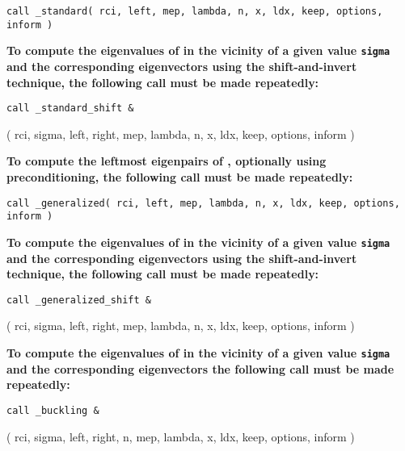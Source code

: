 \medskip
{\tt call
\solver\_standard( rci, left, mep, lambda, n, x, ldx, keep, options, inform )
}

\medskip
\noindent
{\bf
To compute the eigenvalues of  %
in the vicinity of 
a given value {\tt sigma}
and the corresponding eigenvectors using the shift-and-invert technique,
the following call must be made repeatedly:
}

\medskip
{\tt call
\solver\_standard\_shift \&

\hspace{8mm} 
( rci, sigma, left, right, mep, lambda, n, x, ldx, keep, options, inform )
}

\medskip
\noindent
{\bf
To compute %
the leftmost eigenpairs of ,
optionally using preconditioning,
the following call must be made repeatedly:
}

\medskip
{\tt call
\solver\_generalized( rci, left, mep, lambda, n, x, ldx, keep, options, inform )
}

\medskip
\noindent
{\bf
To compute the eigenvalues of  %
in the vicinity of 
a given value {\tt sigma}
and the corresponding eigenvectors using the shift-and-invert technique,
the following call must be made repeatedly:
}

\medskip
{\tt call
\solver\_generalized\_shift \&

\hspace{8mm} 
( rci, sigma, left, right, mep, lambda, n, x, ldx, keep, options, inform )
}

\medskip
\noindent
{\bf
To compute the eigenvalues of  %
in the vicinity of 
a given value {\tt sigma}
and the corresponding eigenvectors %
the following call must be made repeatedly:
}

\medskip
{\tt call
\solver\_buckling \&

\hspace{8mm} 
( rci, sigma, left, right, n, mep, lambda, x, ldx, keep, options, inform )
}


